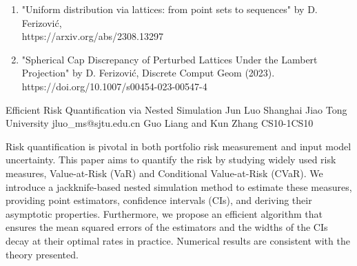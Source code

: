 \begin{talk}
	
		
		\begin{enumerate}
			\item  "Uniform distribution via lattices: from point sets to sequences" by D. Ferizovi\'{c},\\
			 https://arxiv.org/abs/2308.13297
			\item  "Spherical Cap Discrepancy of Perturbed Lattices Under the Lambert Projection" by D. Ferizovi\'{c}, Discrete Comput Geom (2023).\\ https://doi.org/10.1007/s00454-023-00547-4
		\end{enumerate}
		\end{talk}

\begin{talk}
  {Efficient Risk Quantification via Nested Simulation}%
  {Jun Luo}%
  {Shanghai Jiao Tong University}%
  {jluo_ms@sjtu.edu.cn}%
  {Guo Liang and Kun Zhang}%
{}{}{CS10-1}{CS10}

Risk quantification is pivotal in both portfolio risk measurement and input model uncertainty. This paper aims to quantify the risk by studying widely used risk measures, Value-at-Risk (VaR) and Conditional Value-at-Risk (CVaR). We introduce a jackknife-based nested simulation method to estimate these measures, providing point estimators, confidence intervals (CIs), and deriving their asymptotic properties. Furthermore, we propose an efficient algorithm that ensures the mean squared errors of the estimators and the widths of the CIs decay at their optimal rates in practice. Numerical results are consistent with the theory presented.
\end{talk}


